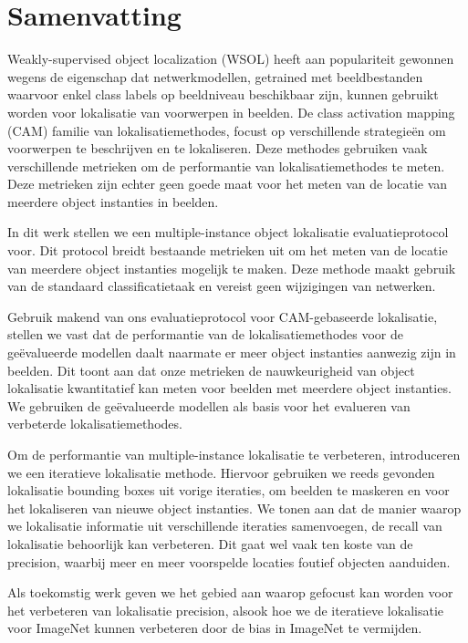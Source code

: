 \chapter*{Samenvatting}

Weakly-supervised object localization (WSOL) heeft aan populariteit gewonnen wegens de eigenschap dat netwerkmodellen, getrained met beeldbestanden waarvoor enkel class labels op beeldniveau beschikbaar zijn, kunnen gebruikt worden voor lokalisatie van voorwerpen in beelden. De class activation mapping (CAM) familie van lokalisatiemethodes, focust op verschillende strategieën om voorwerpen te beschrijven en te lokaliseren. Deze methodes gebruiken vaak verschillende metrieken om de performantie van lokalisatiemethodes te meten. Deze metrieken zijn echter geen goede maat voor het meten van de locatie van meerdere object instanties in beelden.

In dit werk stellen we een multiple-instance object lokalisatie evaluatieprotocol voor. Dit protocol breidt bestaande metrieken uit om het meten van de locatie van meerdere object instanties mogelijk te maken. Deze methode maakt gebruik van de standaard classificatietaak en vereist geen wijzigingen van netwerken.

Gebruik makend van ons evaluatieprotocol voor CAM-gebaseerde lokalisatie, stellen we vast dat de performantie van de lokalisatiemethodes voor de geëvalueerde modellen daalt naarmate er meer object instanties aanwezig zijn in beelden. Dit toont aan dat onze metrieken de nauwkeurigheid van object lokalisatie kwantitatief kan meten voor beelden met meerdere object instanties. We gebruiken de geëvalueerde modellen als basis voor het evalueren van verbeterde lokalisatiemethodes.

Om de performantie van multiple-instance lokalisatie te verbeteren, introduceren we een iteratieve lokalisatie methode. Hiervoor gebruiken we reeds gevonden lokalisatie bounding boxes uit vorige iteraties, om beelden te maskeren en voor het lokaliseren van nieuwe object instanties. We tonen aan dat de manier waarop we lokalisatie informatie uit verschillende iteraties samenvoegen, de recall van lokalisatie behoorlijk kan verbeteren. Dit gaat wel vaak ten koste van de precision, waarbij meer en meer voorspelde locaties foutief objecten aanduiden. 

Als toekomstig werk geven we het gebied aan waarop gefocust kan worden voor het verbeteren van lokalisatie precision, alsook hoe we de iteratieve lokalisatie voor ImageNet kunnen verbeteren door de bias in ImageNet te vermijden.
